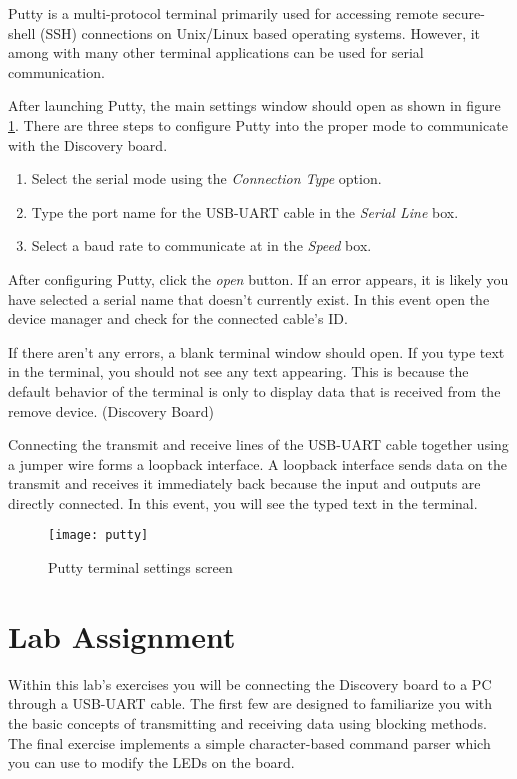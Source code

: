 \documentclass[openany,11pt,fleqn]{book} %
\begin{document}
Putty is a multi-protocol terminal primarily used for accessing remote secure-shell (SSH) connections on Unix/Linux based operating systems. However, it among with many other terminal applications can be used for serial communication.

After launching Putty, the main settings window should open as shown in figure \ref{putty}. There are three steps to configure Putty into the proper mode to communicate with the Discovery board. 
\begin{enumerate}
    \item Select the serial mode using the \textit{Connection Type} option. 
    \item Type the port name for the USB-UART cable in the \textit{Serial Line} box.
    \item Select a baud rate to communicate at in the \textit{Speed} box.
\end{enumerate}

After configuring Putty, click the \textit{open} button. If an error appears, it is likely you have selected a serial name that doesn't currently exist. In this event open the device manager and check for the connected cable's ID. 

If there aren't any errors, a blank terminal window should open. If you type text in the terminal, you should not see any text appearing. This is because the default behavior of the terminal is only to display data that is received from the remove device. (Discovery Board) 

Connecting the transmit and receive lines of the USB-UART cable together using a jumper wire forms a loopback interface. A loopback interface sends data on the transmit and receives it immediately back because the input and outputs are directly connected. In this event, you will see the typed text in the terminal. 

\begin{figure}[]
    \centering\texttt{[image: putty]}
    \caption{Putty terminal settings screen}
    \label{putty}
\end{figure}



\section{\color{blue}Lab Assignment}
Within this lab's exercises you will be connecting the Discovery board to a PC through a USB-UART cable. The first few are designed to familiarize you with the basic concepts of transmitting and receiving data using blocking methods. The final exercise implements a simple character-based command parser which you can use to modify the LEDs on the board.  
\end{document}
